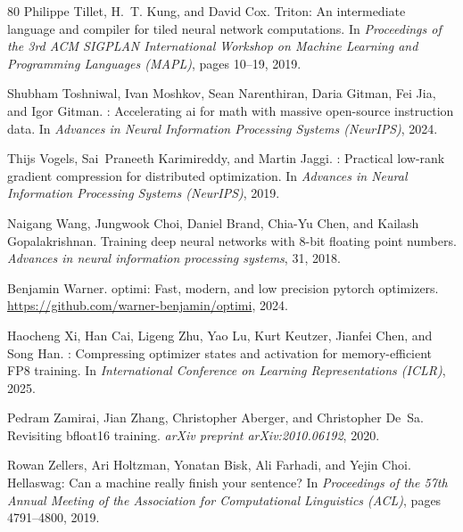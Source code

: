 \documentclass[10pt,twocolumn,letterpaper]{article}
\theoremstyle{plain}
\theoremstyle{definition}
\theoremstyle{remark}
\begin{document}
{\begin{thebibliography}{80}
Philippe Tillet, H.~T. Kung, and David Cox.
\newblock Triton: An intermediate language and compiler for tiled neural
  network computations.
\newblock In \emph{Proceedings of the 3rd ACM SIGPLAN International Workshop on
  Machine Learning and Programming Languages (MAPL)}, pages 10--19, 2019.

Shubham Toshniwal, Ivan Moshkov, Sean Narenthiran, Daria Gitman, Fei Jia, and
  Igor Gitman.
: Accelerating ai for math with massive
  open-source instruction data.
\newblock In \emph{Advances in Neural Information Processing Systems
  (NeurIPS)}, 2024.

Thijs Vogels, Sai~Praneeth Karimireddy, and Martin Jaggi.
: Practical low-rank gradient compression for distributed
  optimization.
\newblock In \emph{Advances in Neural Information Processing Systems
  (NeurIPS)}, 2019.

Naigang Wang, Jungwook Choi, Daniel Brand, Chia-Yu Chen, and Kailash
  Gopalakrishnan.
\newblock Training deep neural networks with 8-bit floating point numbers.
\newblock \emph{Advances in neural information processing systems}, 31, 2018.

Benjamin Warner.
\newblock optimi: Fast, modern, and low precision pytorch optimizers.
\newblock \url{https://github.com/warner-benjamin/optimi}, 2024.

Haocheng Xi, Han Cai, Ligeng Zhu, Yao Lu, Kurt Keutzer, Jianfei Chen, and Song
  Han.
: Compressing optimizer states and activation for
  memory-efficient {FP8} training.
\newblock In \emph{International Conference on Learning Representations
  (ICLR)}, 2025.

Pedram Zamirai, Jian Zhang, Christopher Aberger, and Christopher De~Sa.
\newblock Revisiting bfloat16 training.
\newblock \emph{arXiv preprint arXiv:2010.06192}, 2020.

Rowan Zellers, Ari Holtzman, Yonatan Bisk, Ali Farhadi, and Yejin Choi.
\newblock Hellaswag: Can a machine really finish your sentence?
\newblock In \emph{Proceedings of the 57th Annual Meeting of the Association
  for Computational Linguistics (ACL)}, pages 4791--4800, 2019.


\end{thebibliography}}
\end{document}
